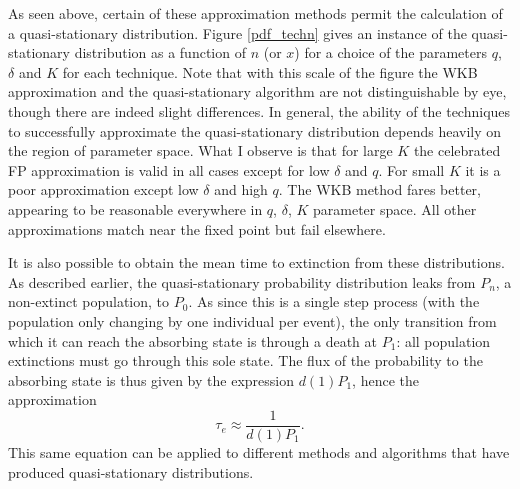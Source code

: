 As seen above, certain of these approximation methods permit the calculation of a quasi-stationary distribution. 
Figure \ref{pdf_techn} gives an instance of the quasi-stationary distribution as a function of $n$ (or $x$) for a choice of the parameters $q$, $\delta$ and $K$ for each technique. 
Note that with this scale of the figure the WKB approximation and the quasi-stationary algorithm are not distinguishable by eye, though there are indeed slight differences. 
In general, the ability of the techniques to successfully approximate the quasi-stationary distribution depends heavily on the region of parameter space. 
What I observe is that for large $K$ the celebrated FP approximation is valid in all cases except for low $\delta$ and $q$. 
For small $K$ it is a poor approximation except low $\delta$ and high $q$. %
The WKB method fares better, appearing to be reasonable everywhere in $q$, $\delta$, $K$ parameter space. 
All other approximations match near the fixed point but fail elsewhere. 

It is also possible to obtain the mean time to extinction from these distributions.
As described earlier, the quasi-stationary probability distribution leaks from $P_n$, a non-extinct population, to $P_0$.
As since this is a single step process (with the population only changing by one individual per event), the only transition from which it can reach the absorbing state is through a death at $P_1$: all population extinctions must go through this sole state. 
The flux of the probability to the absorbing state is thus given by the expression $d(1)P_1$, hence the approximation \cite{textbooks,WKB paper(Assaf2016?)}
\begin{equation}
\tau_e \approx \frac{1}{d(1)P_1}.
\label{1overd1P1}
\end{equation}
This same equation can be applied to different methods and algorithms that have produced quasi-stationary distributions. %

